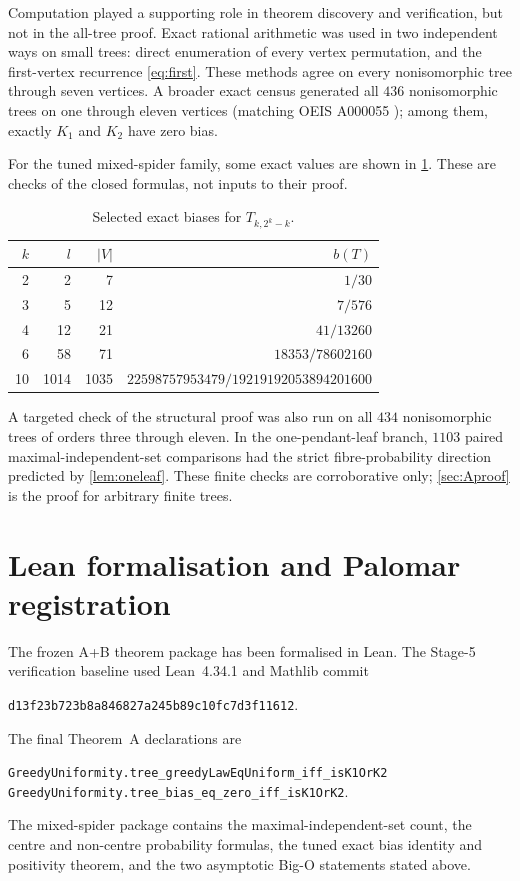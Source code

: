 \documentclass[11pt]{article}
\theoremstyle{definition}
\begin{document}
Computation played a supporting role in theorem discovery and verification, but not in the all-tree proof.  Exact rational arithmetic was used in two independent ways on small trees: direct enumeration of every vertex permutation, and the first-vertex recurrence \eqref{eq:first}.  These methods agree on every nonisomorphic tree through seven vertices.  A broader exact census generated all $436$ nonisomorphic trees on one through eleven vertices (matching OEIS A000055 \cite{OEISA000055}); among them, exactly $K_1$ and $K_2$ have zero bias.

For the tuned mixed-spider family, some exact values are shown in \cref{tab:spider}.  These are checks of the closed formulas, not inputs to their proof.

\begin{table}[ht]
\centering
\caption{Selected exact biases for $T_{k,2^k-k}$.}\label{tab:spider}
\begin{tabular}{rrrr}
\toprule
$k$ & $l$ & $|V|$ & $b(T)$ \\
\midrule
2 & 2 & 7 & $1/30$ \\
3 & 5 & 12 & $7/576$ \\
4 & 12 & 21 & $41/13260$ \\
6 & 58 & 71 & $18353/78602160$ \\
10 & 1014 & 1035 & $22598757953479/19219192053894201600$ \\
\bottomrule
\end{tabular}
\end{table}

A targeted check of the structural proof was also run on all $434$ nonisomorphic trees of orders three through eleven.  In the one-pendant-leaf branch, $1103$ paired maximal-independent-set comparisons had the strict fibre-probability direction predicted by \cref{lem:oneleaf}.  These finite checks are corroborative only; \cref{sec:Aproof} is the proof for arbitrary finite trees.

\section{Lean formalisation and Palomar registration}\label{sec:formal}

The frozen A+B theorem package has been formalised in Lean.  The Stage-5 verification baseline used Lean~4.34.1 and Mathlib commit
\begin{center}
\nolinkurl{d13f23b723b8a846827a245b89c10fc7d3f11612}.
\end{center}
The final Theorem~A declarations are
\begin{center}
\nolinkurl{GreedyUniformity.tree_greedyLawEqUniform_iff_isK1OrK2}\\
\nolinkurl{GreedyUniformity.tree_bias_eq_zero_iff_isK1OrK2}.
\end{center}
The mixed-spider package contains the maximal-independent-set count, the centre and non-centre probability formulas, the tuned exact bias identity and positivity theorem, and the two asymptotic Big-O statements stated above.
\end{document}
